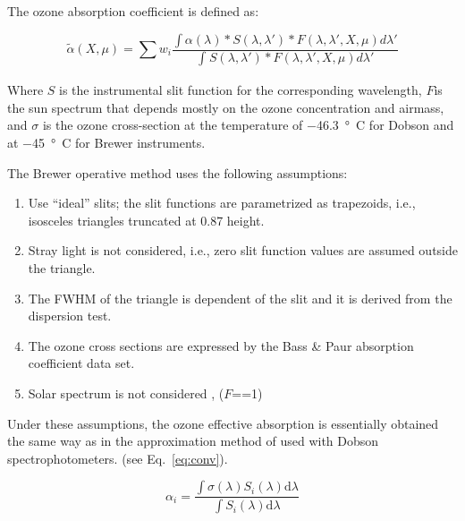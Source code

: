 \documentclass[acp, manuscript]{copernicus}
\begin{document}
The  ozone absorption coefficient is defined as:

\begin{equation}
\widetilde \alpha (X,\mu ) = \sum {{w_i}} \frac{{\int {\alpha (\lambda )*S(\lambda ,\lambda ')*} F(\lambda ,\lambda ',X,\mu )d\lambda '}}{{\int_{}^{} {S(\lambda ,\lambda ')*F(\lambda ,\lambda ',X,\mu )d\lambda '} }}
\end{equation}

Where $S$ is the instrumental slit function for the corresponding wavelength, $F$is the sun spectrum that depends mostly on the ozone concentration and airmass, and $\sigma$ is the ozone cross-section at the temperature of $-$46.3\, \unit{\degree C} for Dobson 
and at $-$45\, \unit{\degree C} for Brewer instruments. 

The Brewer operative method uses the following assumptions:
\begin{enumerate}
	\item Use  “ideal” slits; the slit functions are parametrized as trapezoids, i.e., isosceles triangles truncated at 0.87 height.
	\item Stray light is not considered, i.e., zero slit function values are assumed outside the triangle. 
	\item The FWHM of the triangle is dependent of the slit and it is derived from the dispersion test.
	\item The ozone cross sections are expressed by the Bass \& Paur absorption coefficient data set.
 	\item Solar spectrum is not considered ,  ($F$==1)
\end{enumerate}

Under these assumptions, the ozone effective absorption is essentially obtained the same way as in the approximation method of \citet{Bernhard2005} used with Dobson spectrophotometers. (see Eq.~\ref{eq:conv}).


      \begin{equation}
      \label{eq:conv}
            \alpha_i = \frac{\int \sigma(\lambda) S_i(\lambda) \mbox{d}\lambda}{\int S_i(\lambda) \mbox{d}\lambda}
      \end{equation}

%
\end{document}
